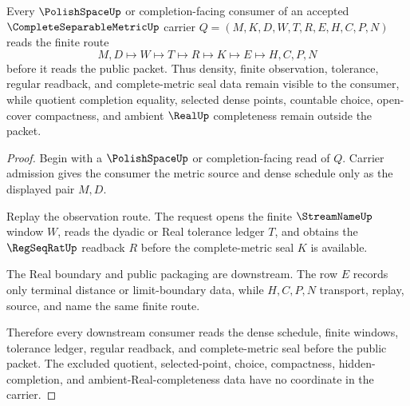 \begin{theorem}\label{thm:complete-separable-metric-density-completion-handoff}
Every $\PolishSpaceUp$ or completion-facing consumer of an accepted $\CompleteSeparableMetricUp$ carrier $Q=(M,K,D,W,T,R,E,H,C,P,N)$ reads the finite route
$$
M,D \longmapsto W \longmapsto T \longmapsto R \longmapsto K \longmapsto E \longmapsto H,C,P,N
$$
before it reads the public packet. Thus density, finite observation, tolerance, regular readback, and complete-metric seal data remain visible to the consumer, while quotient completion equality, selected dense points, countable choice, open-cover compactness, and ambient $\RealUp$ completeness remain outside the packet.
\end{theorem}
\begin{proof}
Begin with a $\PolishSpaceUp$ or completion-facing read of $Q$. Carrier admission gives the consumer the metric source and dense schedule only as the displayed pair $M,D$.

Replay the observation route. The request opens the finite $\StreamNameUp$ window $W$, reads the dyadic or Real tolerance ledger $T$, and obtains the $\RegSeqRatUp$ readback $R$ before the complete-metric seal $K$ is available.

The Real boundary and public packaging are downstream. The row $E$ records only terminal distance or limit-boundary data, while $H,C,P,N$ transport, replay, source, and name the same finite route.

Therefore every downstream consumer reads the dense schedule, finite windows, tolerance ledger, regular readback, and complete-metric seal before the public packet. The excluded quotient, selected-point, choice, compactness, hidden-completion, and ambient-Real-completeness data have no coordinate in the carrier.
\end{proof}

